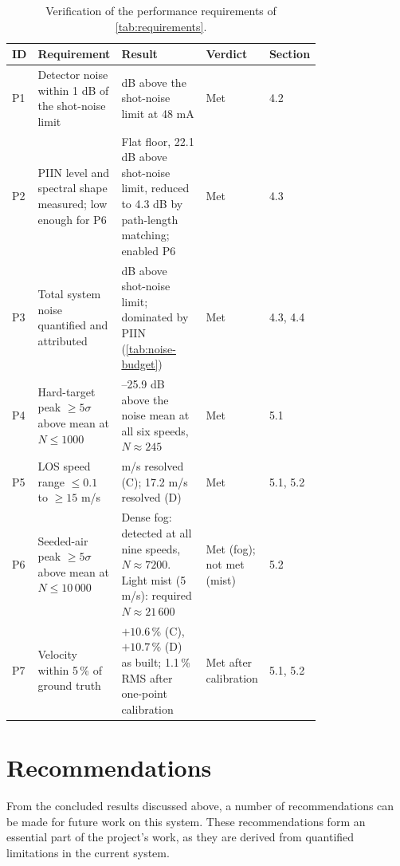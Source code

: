  \begin{table}[H]
 	\centering
 	\small
 	\setlength{\tabcolsep}{4pt}
 	\renewcommand{\arraystretch}{1.2}
 	\begin{tabular}{@{} l
 			>{\raggedright\arraybackslash}p{0.27\linewidth}
 			>{\raggedright\arraybackslash}p{0.38\linewidth}
 			>{\raggedright\arraybackslash}p{0.12\linewidth}
 			l @{}}
 		\toprule
 		\textbf{ID} & \textbf{Requirement} & \textbf{Result} & \textbf{Verdict} & \textbf{Section} \\
 		\midrule
 		P1 & Detector noise within 1 dB of the shot-noise limit
 		& 0.72 dB above the shot-noise limit at 48 mA
 		& Met & 4.2 \\
 		P2 & PIIN level and spectral shape measured; low enough for P6
 		& Flat floor, 22.1 dB above shot-noise limit, reduced to 4.3 dB by path-length matching; enabled P6
 		& Met & 4.3 \\
 		P3 & Total system noise quantified and attributed
 		& 5.7 dB above shot-noise limit; dominated by PIIN (\autoref{tab:noise-budget})
 		& Met & 4.3, 4.4 \\
 		P4 & Hard-target peak $\geq 5\sigma$ above mean at $N \leq 1000$
 		& 16.9--25.9 dB above the noise mean at all six speeds, $N \approx 245$
 		& Met & 5.1 \\
 		P5 & LOS speed range $\leq 0.1$ to $\geq 15$ m/s
 		& 0.056 m/s resolved (C); 17.2 m/s resolved (D)
 		& Met & 5.1, 5.2 \\
 		P6 & Seeded-air peak $\geq 5\sigma$ above mean at $N \leq 10\,000$
 		& Dense fog: detected at all nine speeds, $N \approx 7200$. Light mist (5 m/s): required $N \approx 21\,600$
 		& Met (fog); not met (mist) & 5.2 \\
 		P7 & Velocity within 5\,\% of ground truth
 		& $+10.6$\,\% (C), $+10.7$\,\% (D) as built; 1.1\,\% RMS after one-point calibration
 		& Met after calibration & 5.1, 5.2 \\
 		\bottomrule
 	\end{tabular}
 	\caption{Verification of the performance requirements of \autoref{tab:requirements}.}
 	\label{tab:req-verification}
 \end{table}

\section{Recommendations}
From the concluded results discussed above, a number of recommendations can be made for future work on this system. These recommendations form an essential part of the project's work, as they are derived from quantified limitations in the current system. 

